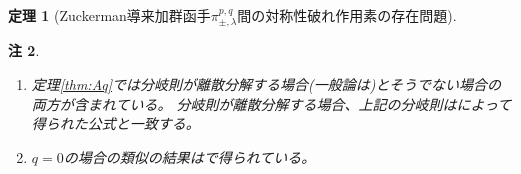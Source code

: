 \documentclass[12pt]{article} %
\newcommand{\Bzeven}{B^{\rm\footnotesize even}}
\newtheorem{theorem}{定理}
\newtheorem{remark}[theorem]{注}
\theoremstyle{definition}
\theoremstyle{exampstyle} \newtheorem{examp}[theorem]{Theorem}
\begin{document}
\begin{theorem}[Zuckerman導来加群函手$\pi_{\pm,\lambda}^{p,q}$間の対称性破れ作用素の存在問題]
\newcommand{\yipxStack}[1][]{\mystack{\yipx}{x\d{\in} \Bzeven(p\d{+}1,q\d{+}1)#1}}
\newcommand{\yimxStack}[1][]{\mystack{\yimx}{x\d{\in} \Bzeven(q\d{+}1,p\d{+}1)#1}}
\newcommand{\yipyStack}[1][]{\mystack{\yipy}{y\d{\in} \Bzeven(p,q\d{+}1)#1}}
\newcommand{\yimyStack}[1][]{\mystack{\yimy}{y\d{\in} \Bzeven(q\d{+}1,p)#1}}

\newcommand{\tzo}{2\Z+1}
\newcommand{\tz}{2\Z}
\newcommand{\tno}{2\N+1}
	
\end{theorem}
\begin{remark}
	\begin{enumerate}[(1)]
		\item 定理\ref{thm:Aq}\;では分岐則が離散分解する場合(一般論は\cite{10.2307/120963})とそうでない場合の両方が含まれている。
			分岐則が離散分解する場合、上記の分岐則は\cite[Thm. 3.3]{kobayashi1993}によって得られた公式と一致する。
		\item $q=0$の場合の類似の結果は\cite[Thms. 12.1 and 1.3]{kobayashi2015symmetry}で得られている。
	\end{enumerate}
\end{remark}
\nocite{kobayashi16birth}
\nocite{kobayashi2015program}
\nocite{kobayashi1993}
\nocite{10.2307/120963}
\small

\end{document}
